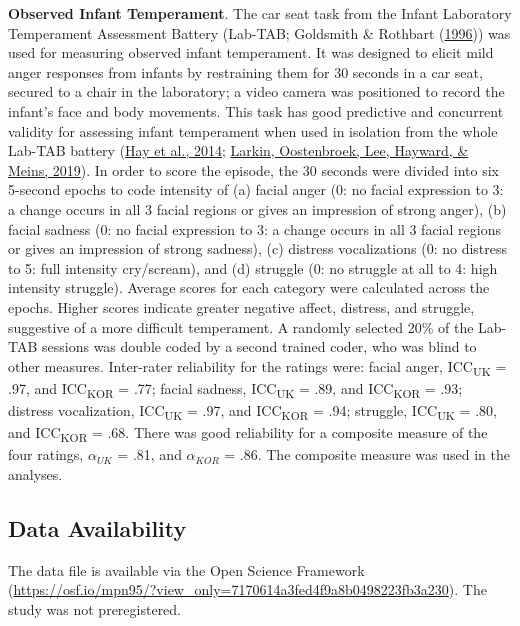 \documentclass[
]{article}
\begin{document}
\textbf{Observed Infant Temperament}. The car seat task from the Infant Laboratory Temperament Assessment Battery (Lab-TAB; Goldsmith \& Rothbart (\protect\hyperlink{ref-Goldsmith1996}{1996})) was used for measuring observed infant temperament. It was designed to elicit mild anger responses from infants by restraining them for 30 seconds in a car seat, secured to a chair in the laboratory; a video camera was positioned to record the infant's face and body movements. This task has good predictive and concurrent validity for assessing infant temperament when used in isolation from the whole Lab-TAB battery (\protect\hyperlink{ref-Hay2014}{Hay et al., 2014}; \protect\hyperlink{ref-Larkin2019}{Larkin, Oostenbroek, Lee, Hayward, \& Meins, 2019}). In order to score the episode, the 30 seconds were divided into six 5-second epochs to code intensity of (a) facial anger (0: no facial expression to 3: a change occurs in all 3 facial regions or gives an impression of strong anger), (b) facial sadness (0: no facial expression to 3: a change occurs in all 3 facial regions or gives an impression of strong sadness), (c) distress vocalizations (0: no distress to 5: full intensity cry/scream), and (d) struggle (0: no struggle at all to 4: high intensity struggle). Average scores for each category were calculated across the epochs. Higher scores indicate greater negative affect, distress, and struggle, suggestive of a more difficult temperament. A randomly selected 20\% of the Lab-TAB sessions was double coded by a second trained coder, who was blind to other measures. Inter-rater reliability for the ratings were: facial anger, ICC\textsubscript{UK} = .97, and ICC\textsubscript{KOR} = .77; facial sadness, ICC\textsubscript{UK} = .89, and ICC\textsubscript{KOR} = .93; distress vocalization, ICC\textsubscript{UK} = .97, and ICC\textsubscript{KOR} = .94; struggle, ICC\textsubscript{UK} = .80, and ICC\textsubscript{KOR} = .68. There was good reliability for a composite measure of the four ratings, \(\alpha_{UK}\) = .81, and \(\alpha_{KOR}\) = .86. The composite measure was used in the analyses.

\hypertarget{data-availability}{%
\subsection*{Data Availability}\label{data-availability}}

The data file is available via the Open Science Framework (\url{https://osf.io/mpn95/?view_only=7170614a3fed4f9a8b0498223fb3a230}). The study was not preregistered.
\end{document}

